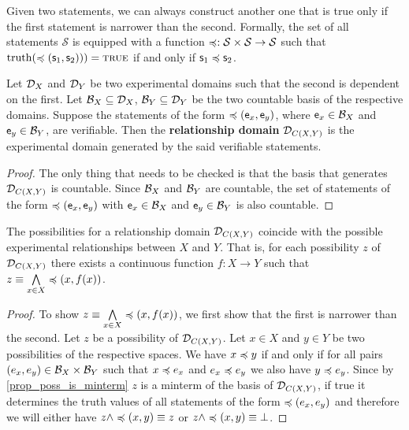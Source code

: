 \documentclass[11pt,letterpaper,fleqn]{memoir} %
\begin{document}
\begin{mathSection}
	\begin{axiom}\label{def_implication_of_statement}
	Given two statements, we can always construct another one that is true only if the first statement is narrower than the second. Formally, the set of all statements $\mathcal{S}$ is equipped with a function $\narrower : \mathcal{S} \times \mathcal{S} \to \mathcal{S}$ such that $\truth(\narrower(\stmt_1, \stmt_2))) = \TRUE$ if and only if $\stmt_1 \narrower \stmt_2$.
	\end{axiom}
	\begin{defn}
		Let $\edomain_X$ and $\edomain_Y$ be two experimental domains such that the second is dependent on the first. Let $\basis_X \subseteq \edomain_X$,  $\basis_Y \subseteq \edomain_Y$ be the two countable basis of the respective domains. Suppose the statements of the form
		$\narrower(\obs[e]_x, \obs[e]_y)$, where $\obs[e]_x \in \basis_X$ and $ \obs[e]_y \in \basis_Y$, are verifiable. Then the \textbf{relationship domain} $\edomain_{C(X,Y)}$ is the experimental domain generated by the said verifiable statements.
	\end{defn}
	\begin{proof}
		The only thing that needs to be checked is that the basis that generates $\edomain_{C(X,Y)}$ is countable. Since $\basis_X$ and $\basis_Y$ are countable, the set of statements of the form $\narrower(\obs[e]_x, \obs[e]_y)$ with $\obs[e]_x \in \basis_X$ and $ \obs[e]_y \in \basis_Y$ is also countable.
	\end{proof}
\begin{prop}
	The possibilities for a relationship domain $\edomain_{C(X,Y)}$ coincide with the possible experimental relationships between $X$ and $Y$. That is, for each possibility $z$ of $\edomain_{C(X,Y)}$ there exists a continuous function $f : X \to Y$ such that $z\equiv\bigAND\limits_{x\in X} \narrower(x, f(x))$.
\end{prop}
\begin{proof}
	To show $z\equiv\bigAND\limits_{x\in X} \narrower(x, f(x))$, we first show that the first is narrower than the second. Let $z$ be a possibility of $\edomain_{C(X,Y)}$. Let $x \in X$ and $y \in Y$ be two possibilities of the respective spaces. We have $x \narrower y$ if and only if for all pairs $(e_x, e_y) \in \basis_X \times \basis_Y$  such that $x \narrower e_x$ and $e_x \narrower e_y$ we also have $y \narrower e_y$. Since by \ref{prop_poss_is_minterm} $z$ is a minterm of the basis of $\edomain_{C(X,Y)}$, if true it determines the truth values of all statements of the form $\narrower (e_x, e_y)$ and therefore we will either have $z \AND \narrower (x, y) \equiv z$ or $z \AND \narrower (x,y) \equiv \contradiction$.
	

\end{proof}
\end{mathSection}
\end{document}
